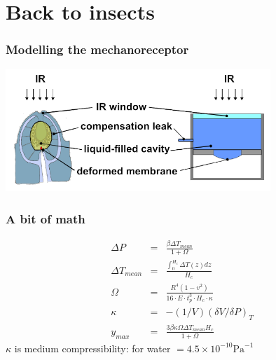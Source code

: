 \documentclass[14pt]{beamer}
\begin{document}
\section{Back to insects}
\begin{frame}
\frametitle{Modelling the mechanoreceptor}
\includegraphics[width=10cm]{themodel.png}
\end{frame}

\begin{frame}
\frametitle{A bit of math}
\begin{eqnarray}
\Delta P &=& \frac{\beta \Delta T_{mean}}{1+\Omega}\\
\Delta T_{mean} &=& \frac{\int_0^{H_c} \Delta T(z) dz}{H_c}\\
\Omega &=& \frac{R^4(1-v^2)}{16\cdot E \cdot t_p^3 \cdot H_c \cdot\kappa}\\
\kappa &=& -(1/V)(\delta V/\delta P)_T\\
y_{max} &=& \frac{3\beta\kappa \Omega \Delta T_{mean} H_c}{1+\Omega}
\end{eqnarray}
$\kappa$ is medium compressibility: for water $=4.5\times 10^{-10} \mathrm{Pa}^{-1}$


\end{frame}
\end{document}
